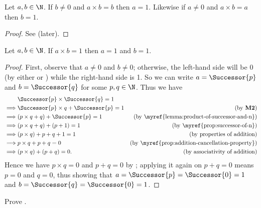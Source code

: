 \begin{proposition}\label{prop:product-that-equals-self}
    Let $a, b \in \N$. If $b \neq 0$ and $a \times b = b$ then $a = 1$. Likewise if $a \neq 0$ and $a \times b = a$ then $b = 1$.
\end{proposition}
\begin{proof}
    See  (later).
\end{proof}

\begin{proposition}\label{prop:product-that-equals-1}
    Let $a, b \in \N$. If $a \times b = 1$ then $a = 1$ and $b = 1$.
\end{proposition}
\begin{proof}
    First, observe that $a \neq 0$ and $b \neq 0$; otherwise, the left-hand side will be 0 (by either  or ) while the right-hand side is 1. So we can write $a = \Successor{p}$ and $b = \Successor{q}$ for some $p, q \in \N$. Thus we have
    \begin{align*}
        &\Successor{p} \times \Successor{q} = 1\\
        \implies& \Successor{p} \times q + \Successor{p} = 1 & (\text{by \textbf{M2}})\\
        \implies& (p\times q + q) + \Successor{p} = 1 & (\text{by \myref{lemma:product-of-successor-and-n}})\\
        \implies& (p \times q + q) + (p + 1) = 1 & (\text{by \myref{prop:successor-of-n}})\\
        \implies& (p \times q) + p + q + 1 = 1 & (\text{by properties of addition})\\
        \implies& p \times q + p + q = 0 & (\text{by \myref{prop:addition-cancellation-property}})\\
        \implies& (p \times q) + (p + q) = 0. & (\text{by associativity of addition})
    \end{align*}
    Hence we have $p \times q = 0$ and $p + q = 0$ by ; applying it again on $p + q = 0$ means $p = 0$ and $q = 0$, thus showing that $a = \Successor{p} = \Successor{0} = 1$ and $b = \Successor{q} = \Successor{0} = 1$.
\end{proof}

\begin{exercise}\label{exercise:product-that-equals-self}
    Prove .
\end{exercise}

